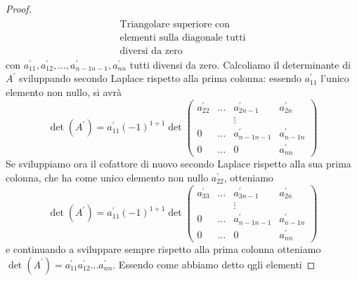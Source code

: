 \begin{teorema}
\begin{proof}
\begin{eqnarray*}
\begin{matrix}
                                 \text{Triangolare superiore con}\\
                                 \text{elementi sulla diagonale tutti}\\
                                 \text{diversi da zero}
                                 \end{matrix}
    \end{eqnarray*}
    con $a^\prime_{11},a^\prime_{12},\dots,a^\prime_{n-1n-1}, a^\prime_{nn}$ tutti divensi da zero.
    Calcoliamo il determinante di $A^\prime$ sviluppando secondo Laplace rispetto alla prima
    colonna: essendo $a^\prime_{11}$ l'unico elemento non nullo, si avrà
    \begin{equation*}
      \det(A^\prime)=a^\prime_{11}(-1)^{1+1}\det\begin{pmatrix}
                                                  a^\prime_{22} & \dots &a^\prime_{2n-1}
                                                  & a^\prime_{2n}\\
                               		          && \vdots\\
                  0 & \dots &a^\prime_{n-1n-1}& a^\prime_{n-1n}\\
                                                  0 & \dots & 0 & a^\prime_{nn}
                                                \end{pmatrix}
    \end{equation*}
    \clearpage
    Se sviluppiamo ora il cofattore di nuovo secondo Laplace rispetto alla sua prima colonna,
    che ha come unico elemento non nullo $a_{22}^\prime$, otteniamo
    \begin{equation*}
      \det(A^\prime)=a^\prime_{11}(-1)^{1+1}\det\begin{pmatrix}
                                                  a^\prime_{33} & \dots &a^\prime_{3n-1}
                                                  & a^\prime_{2n}\\
                               		          && \vdots\\
                  0 & \dots &a^\prime_{n-1n-1}& a^\prime_{n-1n}\\
                                                  0 & \dots & 0 & a^\prime_{nn}
                                                \end{pmatrix}
    \end{equation*}
    e continuando a sviluppare sempre rispetto alla prima colonna otteniamo $\det (A^\prime)=
    a^\prime_{11}a_{12}^\prime\dots a_{nn}^\prime$. Essendo come abbiamo detto qgli elementi

\end{proof}
\end{teorema}
